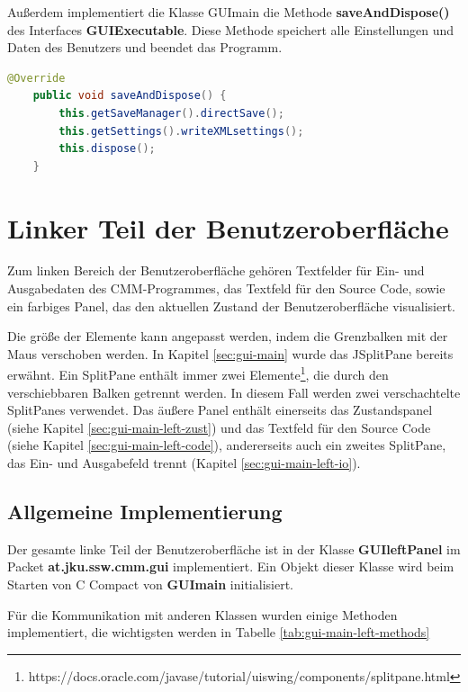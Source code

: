 Außerdem implementiert die Klasse GUImain die Methode \textbf{saveAndDispose()} des Interfaces \textbf{GUIExecutable}. Diese Methode speichert alle Einstellungen und Daten des Benutzers und beendet das Programm.

\begin{lstlisting}[language=JAVA]
	@Override
	public void saveAndDispose() {
		this.getSaveManager().directSave();
		this.getSettings().writeXMLsettings();
		this.dispose();
	}
\end{lstlisting}

\section{Linker Teil der Benutzeroberfläche}
Zum linken Bereich der Benutzeroberfläche gehören Textfelder für Ein- und Ausgabedaten des CMM-Programmes, das Textfeld für den Source Code, sowie ein farbiges Panel, das den aktuellen Zustand der Benutzeroberfläche visualisiert.

Die größe der Elemente kann angepasst werden, indem die Grenzbalken mit der Maus verschoben werden. In Kapitel \ref{sec:gui-main} wurde das JSplitPane bereits erwähnt. Ein SplitPane enthält immer zwei Elemente\footnote{https://docs.oracle.com/javase/tutorial/uiswing/components/splitpane.html}, die durch den verschiebbaren Balken getrennt werden. In diesem Fall werden zwei verschachtelte SplitPanes verwendet. Das äußere Panel enthält einerseits das Zustandspanel (siehe Kapitel \ref{sec:gui-main-left-zust}) und das Textfeld für den Source Code (siehe Kapitel \ref{sec:gui-main-left-code}), andererseits auch ein zweites SplitPane, das Ein- und Ausgabefeld trennt (Kapitel \ref{sec:gui-main-left-io}).

\subsection{Allgemeine Implementierung}
Der gesamte linke Teil der Benutzeroberfläche ist in der Klasse \textbf{GUIleftPanel} im Packet \textbf{at.jku.ssw.cmm.gui} implementiert. Ein Objekt dieser Klasse wird beim Starten von C Compact von \textbf{GUImain} initialisiert.

Für die Kommunikation mit anderen Klassen wurden einige Methoden implementiert, die wichtigsten werden in Tabelle \ref{tab:gui-main-left-methods}

